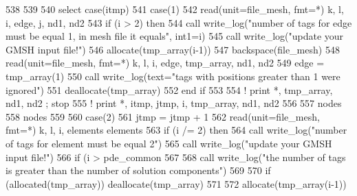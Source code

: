 \begin{DoxyCode}
538 
539         
540         \textcolor{keywordflow}{select case}(itmp)
541           \textcolor{keywordflow}{case}(1)
542             \textcolor{keyword}{read}(unit=file_mesh, fmt=*) k, l, i, edge, j,  nd1, nd2
543             \textcolor{keywordflow}{if} (i > 2) \textcolor{keywordflow}{then}
544               \textcolor{keyword}{call }write_log(\textcolor{stringliteral}{"number of tags for edge must be equal 1, in mesh file it equals"}\textcolor{comment}{, int1=i)}
545 \textcolor{comment}{              }\textcolor{keyword}{call }write_log(\textcolor{stringliteral}{"update your GMSH input file!"})
546               \textcolor{keyword}{allocate}(tmp\_array(i-1))
547               backspace(file_mesh)
548               \textcolor{keyword}{read}(unit=file_mesh, fmt=*) k, l, i, edge,  tmp\_array,  nd1, nd2
549               edge = tmp\_array(1)
550               \textcolor{keyword}{call }write_log(text=\textcolor{stringliteral}{"tags with positions greater than 1 were ignored"}\textcolor{comment}{)}
551 \textcolor{comment}{              }\textcolor{keyword}{deallocate}(tmp\_array)
552 \textcolor{keywordflow}{            end if}
553             
554 \textcolor{comment}{!           print *, tmp\_array, nd1, nd2 ; stop}
555 \textcolor{comment}{!           print *, itmp, jtmp, i, tmp\_array,  nd1, nd2}
556             
557             nodes%
558             nodes%
559             
560           \textcolor{keywordflow}{case}(2)
561             jtmp = jtmp + 1
562             \textcolor{keyword}{read}(unit=file_mesh, fmt=*) k, l, i, elements%
      elements%
563 \textcolor{comment}{            }\textcolor{keywordflow}{if} (i /= 2) \textcolor{keywordflow}{then}
564               \textcolor{keyword}{call }write_log(\textcolor{stringliteral}{"number of tags for element must be equal 2"})
565               \textcolor{keyword}{call }write_log(\textcolor{stringliteral}{"update your GMSH input file!"})
566               \textcolor{keywordflow}{if} (i > pde_common%
567                 
568                 \textcolor{keyword}{call }write_log(\textcolor{stringliteral}{"the number of tags is greater than the number of solution components"}\textcolor{comment}{)}
569 \textcolor{comment}{                }
570 \textcolor{comment}{                }\textcolor{keywordflow}{if} (\textcolor{keyword}{allocated}(tmp\_array)) \textcolor{keyword}{deallocate}(tmp\_array)
571                 
572                 \textcolor{keyword}{allocate}(tmp\_array(i-1))

\end{DoxyCode}
